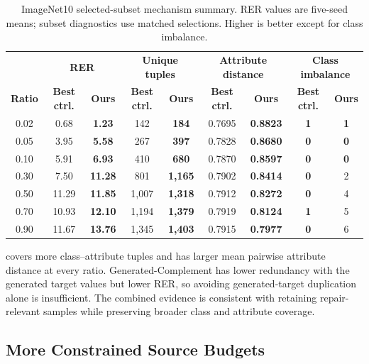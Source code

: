 \begin{table}[htbp]
\centering
\caption{ImageNet10 selected-subset mechanism summary. RER values are five-seed means; subset diagnostics use matched selections. Higher is better except for class imbalance.}
\label{tab:selected-subset-mechanism}
\footnotesize
\setlength{\tabcolsep}{3pt}
\begin{tabular}{c cc cc cc cc}
\toprule
\rowcolor{sectiongray} & \multicolumn{2}{c}{\textbf{RER}} & \multicolumn{2}{c}{\textbf{Unique tuples}} & \multicolumn{2}{c}{\textbf{Attribute distance}} & \multicolumn{2}{c}{\textbf{Class imbalance}} \\
\rowcolor{sectiongray} \textbf{Ratio} & \textbf{Best ctrl.} & \textbf{Ours} & \textbf{Best ctrl.} & \textbf{Ours} & \textbf{Best ctrl.} & \textbf{Ours} & \textbf{Best ctrl.} & \textbf{Ours} \\
\midrule
0.02 & 0.68 & \textbf{1.23} & 142 & \textbf{184} & 0.7695 & \textbf{0.8823} & \textbf{1} & \textbf{1} \\
0.05 & 3.95 & \textbf{5.58} & 267 & \textbf{397} & 0.7828 & \textbf{0.8680} & \textbf{0} & \textbf{0} \\
0.10 & 5.91 & \textbf{6.93} & 410 & \textbf{680} & 0.7870 & \textbf{0.8597} & \textbf{0} & \textbf{0} \\
0.30 & 7.50 & \textbf{11.28} & 801 & \textbf{1,165} & 0.7902 & \textbf{0.8414} & \textbf{0} & 2 \\
0.50 & 11.29 & \textbf{11.85} & 1,007 & \textbf{1,318} & 0.7912 & \textbf{0.8272} & \textbf{0} & 4 \\
0.70 & 10.93 & \textbf{12.10} & 1,194 & \textbf{1,379} & 0.7919 & \textbf{0.8124} & \textbf{1} & 5 \\
0.90 & 11.67 & \textbf{13.76} & 1,345 & \textbf{1,403} & 0.7915 & \textbf{0.7977} & \textbf{0} & 6 \\
\bottomrule
\end{tabular}
\end{table}

\model covers more class--attribute tuples and has larger mean pairwise attribute distance at every ratio. Generated-Complement has lower redundancy with the generated target values but lower RER, so avoiding generated-target duplication alone is insufficient. The combined evidence is consistent with retaining repair-relevant samples while preserving broader class and attribute coverage.

\subsection{More Constrained Source Budgets}

